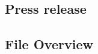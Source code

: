 \documentclass[11pt,a4paper,oneside]{article}
\begin{document}
\subsection{Press release}
\label{app:press_release}

\subsection{File Overview}
\label{app:file_overview}
\end{document}
